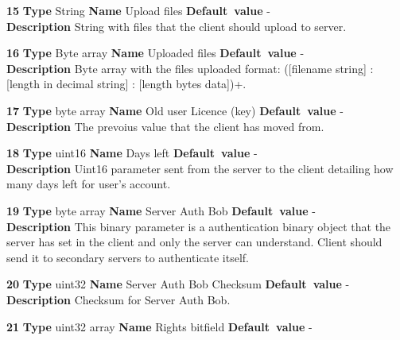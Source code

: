 \begin{list}{\textbf{ParamID}}{}
\item \textbf{15} \textbf{Type} String \textbf{Name} Upload files 
                 \textbf{Default~value} - \\
  \textbf{Description} String with files that the client should upload to 
                       server.
\item \textbf{16} \textbf{Type} Byte array \textbf{Name} Uploaded files 
                 \textbf{Default~value} - \\
  \textbf{Description} Byte array with the files uploaded format: 
  ([filename string] : [length in decimal string] : [length bytes data])+.
\item \textbf{17} \textbf{Type} byte array \textbf{Name} Old user Licence
  (key) \textbf{Default~value} - \\
  \label{Old User Licence (key)}
  \textbf{Description} The prevoius value that the client has moved from.
\item \textbf{18} \textbf{Type} uint16 \textbf{Name} Days left 
                 \textbf{Default~value} - \\
  \textbf{Description} Uint16 parameter sent from the server to the client 
  detailing how many days left for user's account.
\item \textbf{19} \textbf{Type} byte array \textbf{Name} Server Auth Bob
                  \textbf{Default~value} - \\
  \label{Server Auth Bob}
  \textbf{Description} This binary parameter is a authentication binary
                       object that the server has set in the client and
                       only the server can understand. Client should
                       send it to secondary servers to authenticate
                       itself.
\item \textbf{20} \textbf{Type} uint32 \textbf{Name} Server Auth Bob 
                  Checksum
                  \textbf{Default~value} - \\
  \label{Server Auth Bob Checksum}
  \textbf{Description} Checksum for Server Auth Bob.
\item \textbf{21} \textbf{Type} uint32 array \textbf{Name} Rights bitfield
                  \textbf{Default~value} - \\

\end{list}
